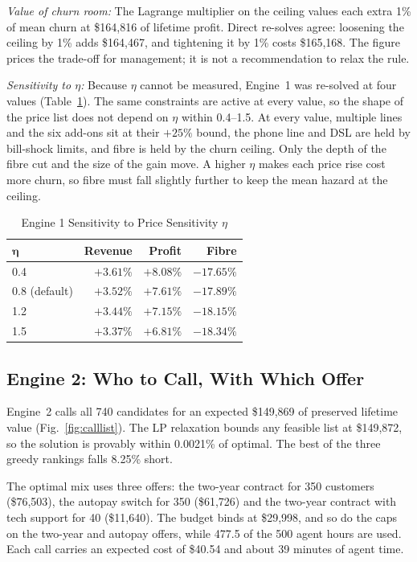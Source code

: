 \documentclass[conference]{IEEEtran}
\begin{document}
\textit{Value of churn room:} The Lagrange multiplier on the ceiling values each extra 1\% of mean churn at \$164,816 of lifetime profit. Direct re-solves agree: loosening the ceiling by 1\% adds \$164,467, and tightening it by 1\% costs \$165,168. The figure prices the trade-off for management; it is not a recommendation to relax the rule.

\textit{Sensitivity to $\eta$:} Because $\eta$ cannot be measured, Engine~1 was re-solved at four values (Table~\ref{tab:eta}). The same constraints are active at every value, so the shape of the price list does not depend on $\eta$ within 0.4--1.5. At every value, multiple lines and the six add-ons sit at their $+25\%$ bound, the phone line and DSL are held by bill-shock limits, and fibre is held by the churn ceiling. Only the depth of the fibre cut and the size of the gain move. A higher $\eta$ makes each price rise cost more churn, so fibre must fall slightly further to keep the mean hazard at the ceiling.

\begin{table}[!t]
\caption{Engine 1 Sensitivity to Price Sensitivity $\eta$}
\label{tab:eta}
\centering
\footnotesize
\begin{tabular}{@{}lrrr@{}}
\toprule
$\boldsymbol{\eta}$ & \textbf{Revenue} & \textbf{Profit} & \textbf{Fibre} \\
\midrule
0.4 & $+3.61\%$ & $+8.08\%$ & $-17.65\%$ \\
0.8 (default) & $+3.52\%$ & $+7.61\%$ & $-17.89\%$ \\
1.2 & $+3.44\%$ & $+7.15\%$ & $-18.15\%$ \\
1.5 & $+3.37\%$ & $+6.81\%$ & $-18.34\%$ \\
\bottomrule
\end{tabular}
\end{table}

\subsection{Engine 2: Who to Call, With Which Offer}
\label{sec:res-e2}

Engine~2 calls all 740 candidates for an expected \$149,869 of preserved lifetime value (Fig.~\ref{fig:calllist}). The LP relaxation bounds any feasible list at \$149,872, so the solution is provably within 0.0021\% of optimal. The best of the three greedy rankings falls 8.25\% short.

The optimal mix uses three offers: the two-year contract for 350 customers (\$76,503), the autopay switch for 350 (\$61,726) and the two-year contract with tech support for 40 (\$11,640). The budget binds at \$29,998, and so do the caps on the two-year and autopay offers, while 477.5 of the 500 agent hours are used. Each call carries an expected cost of \$40.54 and about 39 minutes of agent time.
\end{document}
